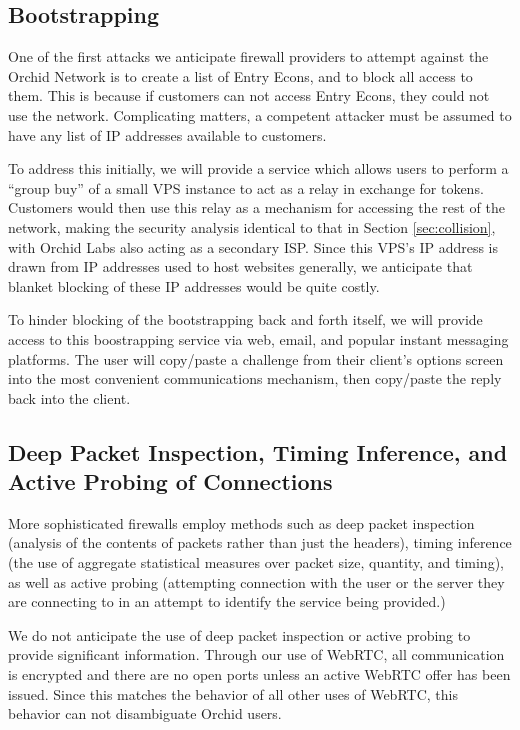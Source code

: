 \documentclass{article}
\begin{document}
\subsection{Bootstrapping}

One of the first attacks we anticipate firewall providers to attempt
against the Orchid Network is to create a list of Entry Econs, and to
block all access to them. This is because if customers can not access
Entry Econs, they could not use the network. Complicating matters, a
competent attacker must be assumed to have any list of IP addresses
available to customers.

To address this initially, we will provide a service which allows
users to perform a ``group buy'' of a small VPS instance to act as a
relay in exchange for tokens. Customers would then use this relay as a
mechanism for accessing the rest of the network, making the security
analysis identical to that in Section \ref{sec:collision}, with Orchid
Labs also acting as a secondary ISP. Since this VPS's IP address is
drawn from IP addresses used to host websites generally, we anticipate
that blanket blocking of these IP addresses would be quite costly.

To hinder blocking of the bootstrapping back and forth itself, we will
provide access to this boostrapping service via web, email, and
popular instant messaging platforms. The user will copy/paste a
challenge from their client's options screen into the most convenient
communications mechanism, then copy/paste the reply back into the
client.

\subsection{Deep Packet Inspection, Timing Inference, and Active Probing of Connections}

More sophisticated firewalls employ methods such as deep packet
inspection (analysis of the contents of packets rather than just the
headers), timing inference (the use of aggregate statistical measures
over packet size, quantity, and timing), as well as active probing
(attempting connection with the user or the server they are connecting
to in an attempt to identify the service being provided.)

We do not anticipate the use of deep packet inspection or active
probing to provide significant information. Through our use of WebRTC,
all communication is encrypted and there are no open ports unless an
active WebRTC offer has been issued. Since this matches the behavior
of all other uses of WebRTC, this behavior can not disambiguate Orchid
users.
\end{document}

